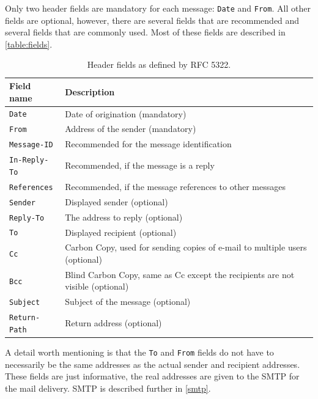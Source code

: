 Only two header fields are mandatory for each message: \texttt{Date} and \texttt{From}. All other fields are optional, however, there are several fields that are recommended and several fields that are commonly used. Most of these fields are described in \autoref{table:fields}. 
\begin{table}[t]
\centering
\renewcommand{\arraystretch}{1.4}
\begin{tabular}{l p{20em}}
 \toprule
 Field name & Description\\
\midrule
 \texttt{Date} & Date of origination (mandatory)\\
 \texttt{From} & Address of the sender (mandatory)\\
 \texttt{Message-ID} & Recommended for the message identification\\
 \texttt{In-Reply-To} & Recommended, if the message is a reply\\
 \texttt{References} & Recommended, if the message references to other messages\\
 \texttt{Sender} & Displayed sender (optional)\\
 \texttt{Reply-To} & The address to reply (optional)\\
 \texttt{To} & Displayed recipient (optional)\\
 \texttt{Cc} & Carbon Copy, used for sending copies of e-mail to multiple users (optional)\\
 \texttt{Bcc} & Blind Carbon Copy, same as Cc except the recipients are not visible (optional)\\
 \texttt{Subject} & Subject of the message (optional)\\
 \texttt{Return-Path} & Return address (optional)\\
\bottomrule
\end{tabular}
\caption{Header fields as defined by RFC 5322.}
\label{table:fields}
\end{table}
A detail worth mentioning is that the \texttt{To} and \texttt{From} fields do not have to necessarily be the same addresses as the actual sender and recipient addresses. These fields are just informative, the real addresses are given to the SMTP for the mail delivery. SMTP is described further in \autoref{smtp}. 

